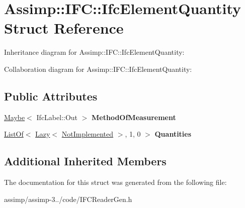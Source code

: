\hypertarget{struct_assimp_1_1_i_f_c_1_1_ifc_element_quantity}{\section{Assimp\+:\+:I\+F\+C\+:\+:Ifc\+Element\+Quantity Struct Reference}
\label{struct_assimp_1_1_i_f_c_1_1_ifc_element_quantity}
}


Inheritance diagram for Assimp\+:\+:I\+F\+C\+:\+:Ifc\+Element\+Quantity\+:


Collaboration diagram for Assimp\+:\+:I\+F\+C\+:\+:Ifc\+Element\+Quantity\+:
\subsection*{Public Attributes}
\begin{DoxyCompactItemize}
\item 
\hypertarget{struct_assimp_1_1_i_f_c_1_1_ifc_element_quantity_a6107a0b9fe65e7b698945953017f1e10}{\hyperlink{struct_assimp_1_1_s_t_e_p_1_1_maybe}{Maybe}$<$ Ifc\+Label\+::\+Out $>$ {\bfseries Method\+Of\+Measurement}}\label{struct_assimp_1_1_i_f_c_1_1_ifc_element_quantity_a6107a0b9fe65e7b698945953017f1e10}

\item 
\hypertarget{struct_assimp_1_1_i_f_c_1_1_ifc_element_quantity_ae213a49980f23955668062f7d452c4d1}{\hyperlink{struct_assimp_1_1_s_t_e_p_1_1_list_of}{List\+Of}$<$ \hyperlink{struct_assimp_1_1_s_t_e_p_1_1_lazy}{Lazy}$<$ \hyperlink{struct_assimp_1_1_i_f_c_1_1_not_implemented}{Not\+Implemented} $>$, 1, 0 $>$ {\bfseries Quantities}}\label{struct_assimp_1_1_i_f_c_1_1_ifc_element_quantity_ae213a49980f23955668062f7d452c4d1}

\end{DoxyCompactItemize}
\subsection*{Additional Inherited Members}


The documentation for this struct was generated from the following file\+:\begin{DoxyCompactItemize}
\item 
assimp/assimp-\/3../code/I\+F\+C\+Reader\+Gen.\+h\end{DoxyCompactItemize}
